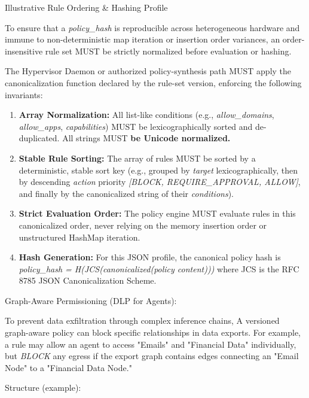 \documentclass[
  11pt,
]{article}
\providecommand{\tightlist}{%
  \setlength{\itemsep}{0pt}\setlength{\parskip}{0pt}}
\begin{document}
Illustrative Rule Ordering \& Hashing Profile

To ensure that a \emph{policy\_hash} is reproducible across
heterogeneous hardware and immune to non-deterministic map iteration or
insertion order variances, an order-insensitive rule set MUST be
strictly normalized before evaluation or hashing.

The Hypervisor Daemon or authorized policy-synthesis path MUST apply the
canonicalization function declared by the rule-set version, enforcing the
following invariants:

\begin{enumerate}
\def\labelenumi{\arabic{enumi}.}
\tightlist
\item
  \textbf{Array Normalization:} All list-like conditions (e.g.,
  \emph{allow\_domains}, \emph{allow\_apps}, \emph{capabilities}) MUST
  be lexicographically sorted and de-duplicated. All strings MUST
  \textbf{be Unicode normalized.}
\item
  \textbf{Stable Rule Sorting:} The array of rules MUST be sorted by a
  deterministic, stable sort key (e.g., grouped by \emph{target}
  lexicographically, then by descending \emph{action} priority
  \emph{{[}BLOCK, REQUIRE\_APPROVAL, ALLOW{]}}, and finally by the
  canonicalized string of their \emph{conditions}).
\item
  \textbf{Strict Evaluation Order:} The policy engine MUST evaluate
  rules in this canonicalized order, never relying on the memory
  insertion order or unstructured HashMap iteration.
\item
  \textbf{Hash Generation:} For this JSON profile, the canonical policy
  hash is \emph{policy\_hash = H(JCS(canonicalized(policy content)))}
  where JCS is the RFC 8785 JSON Canonicalization Scheme.
\end{enumerate}

Graph-Aware Permissioning (DLP for Agents):

To prevent data exfiltration through complex inference chains,
A versioned graph-aware policy can block specific relationships in data exports. For
example, a rule may allow an agent to access "Emails" and "Financial
Data" individually, but \emph{BLOCK} any egress if the export graph
contains edges connecting an "Email Node" to a "Financial Data Node."

Structure (example):
\end{document}
